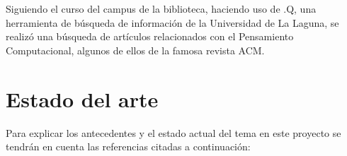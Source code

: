 
Siguiendo el curso del campus de la biblioteca, haciendo uso de .Q, una herramienta de búsqueda de información de la Universidad de La Laguna, se realizó una búsqueda de artículos relacionados con el Pensamiento Computacional, algunos de ellos de la famosa revista ACM.


\section{Estado del arte}
\label{2:sec:1}

Para explicar los antecedentes y el estado actual del tema en este proyecto se tendrán en cuenta las referencias citadas a continuación:

